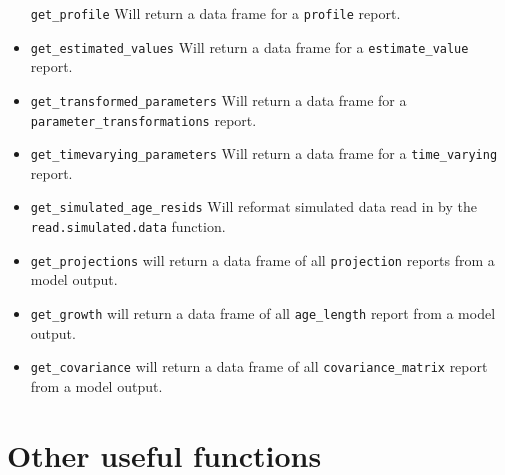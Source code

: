 \documentclass[
]{book}
\begin{document}
\begin{itemize}
  \texttt{get\_profile} Will return a data frame for a \texttt{profile} report.
\item
  \texttt{get\_estimated\_values} Will return a data frame for a \texttt{estimate\_value} report.
\item
  \texttt{get\_transformed\_parameters} Will return a data frame for a \texttt{parameter\_transformations} report.
\item
  \texttt{get\_timevarying\_parameters} Will return a data frame for a \texttt{time\_varying} report.
\item
  \texttt{get\_simulated\_age\_resids} Will reformat simulated data read in by the \texttt{read.simulated.data} function.
\item
  \texttt{get\_projections} will return a data frame of all \texttt{projection} reports from a model output.
\item
  \texttt{get\_growth} will return a data frame of all \texttt{age\_length} report from a model output.
\item
  \texttt{get\_covariance} will return a data frame of all \texttt{covariance\_matrix} report from a model output.
\end{itemize}

\hypertarget{other-useful-functions}{%
\section{Other useful functions}\label{other-useful-functions}}
\end{document}
